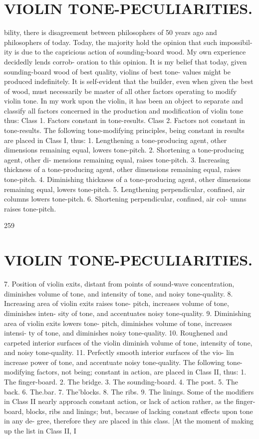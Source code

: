\documentclass{article}
\begin{document}
\section*{VIOLIN TONE-PECULIARITIES.}
bility, there is disagreement between philosophers of 50 years ago and philosophers of today. Today, the majority hold the opinion that such impossibil- ity is due to the capricious action of sounding-board wood. My own experience decidedly lends corrob- oration to this opinion. It is my belief that today, given sounding-board wood of best quality, violins of best tone- values might be produced indefinitely. It is self-evident that the builder, even when given the best of wood, must necessarily be master of all other factors operating to modify violin tone. In my work upon the violin, it has been an object to separate and classify all factors concerned in the production and modification of violin tone thus: Class 1. Factors constant in tone-results. Class 2. Factors not constant in tone-results. The following tone-modifying principles, being constant in results are placed in Class I, thus: 1. Lengthening a tone-producing agent, other dimensions remaining equal, lowers tone-pitch. 2. Shortening a tone-producing agent, other di- mensions remaining equal, raises tone-pitch. 3. Increasing thickness of a tone-producing agent, other dimensions remaining equal, raises tone-pitch. 4. Diminishing thickness of a tone-producing agent, other dimensions remaining equal, lowers tone-pitch. 5. Lengthening perpendicular, confined, air columns lowers tone-pitch. 6. Shortening perpendicular, confined, air col- umns raises tone-pitch.

259

\section*{VIOLIN TONE-PECULIARITIES.}
7. Position of violin exits, distant from points of sound-wave concentration, diminishes volume of tone, and intensity of tone, and noisy tone-quality. 8. Increasing area of violin exits raises tone- pitch, increases volume of tone, diminishes inten- sity of tone, and accentuates noisy tone-quality. 9. Diminishing area of violin exits lowers tone- pitch, diminishes volume of tone, increases intensi- ty of tone, and diminishes noisy tone-quality. 10. Roughened and carpeted interior surfaces of the violin diminish volume of tone, intensity of tone, and noisy tone-quality. 11. Perfectly smooth interior surfaces of the vio- lin increase power of tone, and accentuate noisy tone-quality. The following tone-modifying factors, not being; constant in action, are placed in Class II, thus: 1. The finger-board. 2. The bridge. 3. The sounding-board. 4. The post. 5. The back. 6. The.bar. 7. The'blocks. 8. The ribs. 9. The linings. Some of the modifiers in Class II nearly approach constant action, or lack of action rather, as the finger-board, blocks, ribs and linings; but, because of lacking constant effects upon tone in any de- gree, therefore they are placed in this class. [At the moment of making up the list in Class II, I
\end{document}

